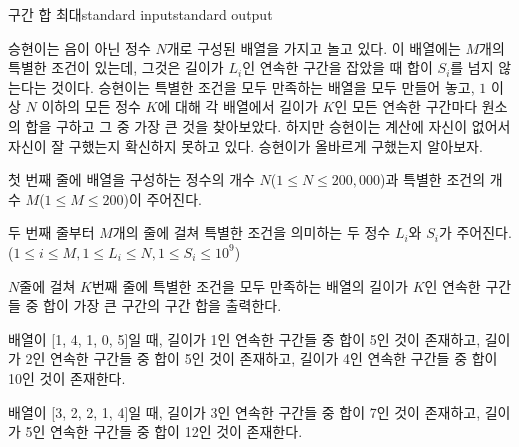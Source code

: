 \begin{problem}{구간 합 최대}{standard input}{standard output}

승현이는 음이 아닌 정수 $N$개로 구성된 배열을 가지고 놀고 있다. 이 배열에는 $M$개의 특별한 조건이 있는데, 그것은 길이가 $L_i$인 연속한 구간을 잡았을 때 합이 $S_i$를 넘지 않는다는 것이다. 승현이는 특별한 조건을 모두 만족하는 배열을 모두 만들어 놓고, $1$ 이상 $N$ 이하의 모든 정수 $K$에 대해 각 배열에서 길이가 $K$인 모든 연속한 구간마다 원소의 합을 구하고 그 중 가장 큰 것을 찾아보았다. 하지만 승현이는 계산에 자신이 없어서 자신이 잘 구했는지 확신하지 못하고 있다. 승현이가 올바르게 구했는지 알아보자.

\InputFile
첫 번째 줄에 배열을 구성하는 정수의 개수 $N$($1 \le N \le 200,000$)과 특별한 조건의 개수 $M$($1 \le M \le 200$)이 주어진다.

두 번째 줄부터 $M$개의 줄에 걸쳐 특별한 조건을 의미하는 두 정수 $L_i$와 $S_i$가 주어진다. ($1 \le i \le M, 1 \le L_i \le N, 1 \le S_i \le 10^9$)

\OutputFile
$N$줄에 걸쳐 $K$번째 줄에 특별한 조건을 모두 만족하는 배열의 길이가 $K$인 연속한 구간들 중 합이 가장 큰 구간의 구간 합을 출력한다.

\Example

\begin{example}
%
\end{example}

\Notes

배열이 [1, 4, 1, 0, 5]일 때, 길이가 1인 연속한 구간들 중 합이 5인 것이 존재하고, 길이가 2인 연속한 구간들 중 합이 5인 것이 존재하고, 길이가 4인 연속한 구간들 중 합이 10인 것이 존재한다.

배열이 [3, 2, 2, 1, 4]일 때, 길이가 3인 연속한 구간들 중 합이 7인 것이 존재하고, 길이가 5인 연속한 구간들 중 합이 12인 것이 존재한다.

\end{problem}

